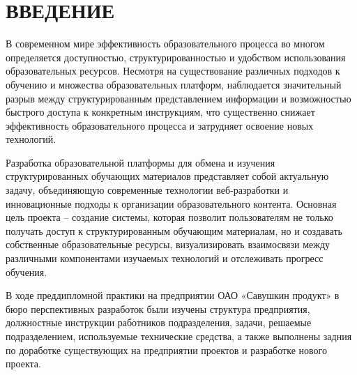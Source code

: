 \sectionbreak \section*{ 
    \gostTitleFont
    \redline
    ВВЕДЕНИЕ
}

\subtitlespace

{\gostFont

\par \redline В современном мире эффективность образовательного процесса во многом определяется доступностью, структурированностью и удобством использования образовательных ресурсов. Несмотря на существование различных подходов к обучению и множества образовательных платформ, наблюдается значительный разрыв между структурированным представлением информации и возможностью быстрого доступа к конкретным инструкциям, что существенно снижает эффективность образовательного процесса и затрудняет освоение новых технологий.

\par \redline Разработка образовательной платформы для обмена и изучения структурированных обучающих материалов представляет собой актуальную задачу, объединяющую современные технологии веб-разработки и инновационные подходы к организации образовательного контента. Основная цель проекта – создание системы, которая позволит пользователям не только получать доступ к структурированным обучающим материалам, но и создавать собственные образовательные ресурсы, визуализировать взаимосвязи между различными компонентами изучаемых технологий и отслеживать прогресс обучения.

\par \redline В ходе преддипломной практики на предприятии ОАО «Савушкин продукт» в бюро перспективных разработок были изучены структура предприятия, должностные инструкции работников подразделения, задачи, решаемые подразделением, используемые технические средства, а также выполнены задния по доработке существующих на предприятии проектов и разработке нового проекта.

\par
}
